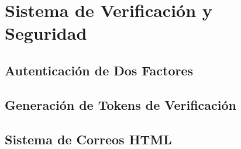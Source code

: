 \chapter{Sistema de Verificación y Seguridad}
\section{Autenticación de Dos Factores}
\section{Generación de Tokens de Verificación}
\section{Sistema de Correos HTML}
